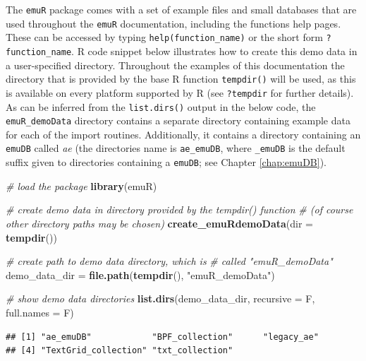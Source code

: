 \documentclass[]{book}
\newenvironment{Shaded}{\begin{snugshade}}{\end{snugshade}}
\newcommand{\CommentTok}[1]{\textcolor[rgb]{0.56,0.35,0.01}{\textit{#1}}}
\newcommand{\DataTypeTok}[1]{\textcolor[rgb]{0.13,0.29,0.53}{#1}}
\newcommand{\KeywordTok}[1]{\textcolor[rgb]{0.13,0.29,0.53}{\textbf{#1}}}
\newcommand{\NormalTok}[1]{#1}
\newcommand{\StringTok}[1]{\textcolor[rgb]{0.31,0.60,0.02}{#1}}
\begin{document}
The \texttt{emuR} package comes with a set of example files and small databases that are used throughout the \texttt{emuR} documentation, including the functions help pages. These can be accessed by typing \texttt{help(function\_name)} or the short form \texttt{?function\_name}. R code snippet below illustrates how to create this demo data in a user-specified directory. Throughout the examples of this documentation the directory that is provided by the base R function \texttt{tempdir()} will be used, as this is available on every platform supported by R (see \texttt{?tempdir} for further details). As can be inferred from the \texttt{list.dirs()} output in the below code, the \texttt{emuR\_demoData} directory contains a separate directory containing example data for each of the import routines. Additionally, it contains a directory containing an \texttt{emuDB} called \emph{ae} (the directories name is \texttt{ae\_emuDB}, where \texttt{\_emuDB} is the default suffix given to directories containing a \texttt{emuDB}; see Chapter \ref{chap:emuDB}).

\begin{Shaded}
\begin{Highlighting}[]
\CommentTok{# load the package}
\KeywordTok{library}\NormalTok{(emuR)}

\CommentTok{# create demo data in directory provided by the tempdir() function}
\CommentTok{# (of course other directory paths may be chosen)}
\KeywordTok{create_emuRdemoData}\NormalTok{(}\DataTypeTok{dir =} \KeywordTok{tempdir}\NormalTok{())}

\CommentTok{# create path to demo data directory, which is}
\CommentTok{# called "emuR_demoData"}
\NormalTok{demo_data_dir =}\StringTok{ }\KeywordTok{file.path}\NormalTok{(}\KeywordTok{tempdir}\NormalTok{(), }\StringTok{"emuR_demoData"}\NormalTok{)}

\CommentTok{# show demo data directories}
\KeywordTok{list.dirs}\NormalTok{(demo_data_dir, }\DataTypeTok{recursive =}\NormalTok{ F, }\DataTypeTok{full.names =}\NormalTok{ F)}
\end{Highlighting}
\end{Shaded}

\begin{verbatim}
## [1] "ae_emuDB"            "BPF_collection"      "legacy_ae"          
## [4] "TextGrid_collection" "txt_collection"
\end{verbatim}
\end{document}
